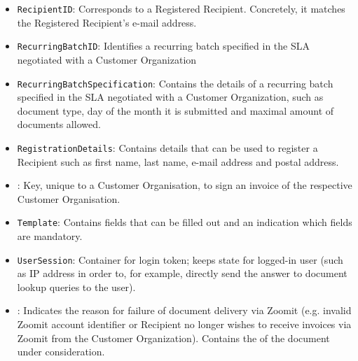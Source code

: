 \begin{itemize}
	\item \texttt{RecipientID}: Corresponds to a Registered Recipient. Concretely, it matches the Registered Recipient's e-mail address.
	\item \texttt{RecurringBatchID}: Identifies a recurring batch specified in the SLA negotiated with a Customer Organization
	\item \texttt{RecurringBatchSpecification}: Contains the details of a recurring batch specified in the SLA negotiated with a Customer Organization, such as document type, day of the month it is submitted and maximal amount of documents allowed.
	\item \texttt{RegistrationDetails}: Contains details that can be used to register a Recipient such as first name, last name, e-mail address and postal address.
	\item {}: Key, unique to a Customer Organisation, to sign an invoice of the respective Customer Organisation.
	\item \texttt{Template}: Contains fields that can be filled out and an indication which fields are mandatory.
	\item \texttt{UserSession}: Container for login token; keeps state for logged-in user (such as IP address in order to, for example, directly send the answer to document lookup queries to the user).
	\item {}: Indicates the reason for failure of document delivery via Zoomit (e.g. invalid Zoomit account identifier or Recipient no longer wishes to receive invoices via Zoomit from the Customer Organization). Contains the  of the document under consideration.
\end{itemize}